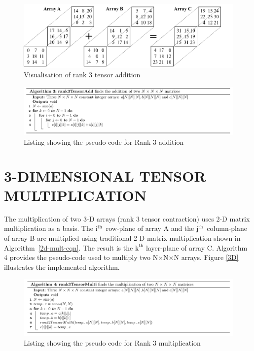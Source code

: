 \begin{figure}
	\centering
	\includegraphics[width=2\columnwidth]{build/AdditionDiagram_3D.png}
	\vspace{3mm}
	\caption{Visualisation of rank 3 tensor addition}
	\label{fig:3Dadd}
\end{figure}

\begin{figure}
\includegraphics[width=2\columnwidth]{build/Algo3.png}
\caption{Listing showing the pseudo code for Rank 3 addition}
\end{figure}

\section{3-DIMENSIONAL TENSOR MULTIPLICATION} \label{3Dmult}

The multiplication of two 3-D arrays (rank 3 tensor contraction) uses 2-D matrix multiplication as a basis. The $\text{i}^\text{th}$~row-plane of array A and the $\text{j}^\text{th}$~column-plane of array B are multiplied using traditional 2-D matrix multiplication shown in Algorithm~\ref{2d-mult-eqn}. The result is the $\text{k}^\text{th}$ layer-plane of array C. Algorithm 4 provides the pseudo-code used to multiply two N$\times$N$\times$N arrays. Figure \ref{3D} illustrates the implemented algorithm.

\begin{figure}
\includegraphics[width=2\columnwidth]{build/Algo4.png}
\caption{Listing showing the pseudo code for Rank 3 multiplication}
\end{figure}

